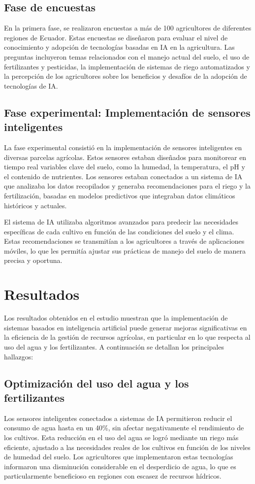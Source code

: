 \documentclass[9pt,twocolumn,twoside]{opticajnl}
\begin{document}
\subsection{Fase de encuestas}
En la primera fase, se realizaron encuestas a más de 100 agricultores de diferentes regiones de Ecuador. Estas encuestas se diseñaron para evaluar el nivel de conocimiento y adopción de tecnologías basadas en IA en la agricultura. Las preguntas incluyeron temas relacionados con el manejo actual del suelo, el uso de fertilizantes y pesticidas, la implementación de sistemas de riego automatizados y la percepción de los agricultores sobre los beneficios y desafíos de la adopción de tecnologías de IA.

\subsection{Fase experimental: Implementación de sensores inteligentes}
La fase experimental consistió en la implementación de sensores inteligentes en diversas parcelas agrícolas. Estos sensores estaban diseñados para monitorear en tiempo real variables clave del suelo, como la humedad, la temperatura, el pH y el contenido de nutrientes. Los sensores estaban conectados a un sistema de IA que analizaba los datos recopilados y generaba recomendaciones para el riego y la fertilización, basadas en modelos predictivos que integraban datos climáticos históricos y actuales.

El sistema de IA utilizaba algoritmos avanzados para predecir las necesidades específicas de cada cultivo en función de las condiciones del suelo y el clima. Estas recomendaciones se transmitían a los agricultores a través de aplicaciones móviles, lo que les permitía ajustar sus prácticas de manejo del suelo de manera precisa y oportuna.

\section{Resultados}
Los resultados obtenidos en el estudio muestran que la implementación de sistemas basados en inteligencia artificial puede generar mejoras significativas en la eficiencia de la gestión de recursos agrícolas, en particular en lo que respecta al uso del agua y los fertilizantes. A continuación se detallan los principales hallazgos:

\subsection{Optimización del uso del agua y los fertilizantes}
Los sensores inteligentes conectados a sistemas de IA permitieron reducir el consumo de agua hasta en un 40\%, sin afectar negativamente el rendimiento de los cultivos. Esta reducción en el uso del agua se logró mediante un riego más eficiente, ajustado a las necesidades reales de los cultivos en función de los niveles de humedad del suelo. Los agricultores que implementaron estas tecnologías informaron una disminución considerable en el desperdicio de agua, lo que es particularmente beneficioso en regiones con escasez de recursos hídricos.
\end{document}

